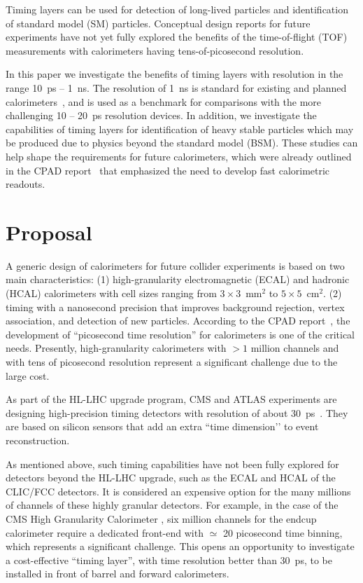 \documentclass[final,1p,11pt]{elsarticle}
\begin{document}
Timing layers can be used for detection of long-lived particles and identification of standard model (SM) particles. 
Conceptual design reports for future experiments have not yet fully explored 
the benefits of the time-of-flight (TOF) measurements with calorimeters having tens-of-picosecond resolution.

In this paper we investigate the benefits of timing layers with resolution in the range 10~ps -- 1~ns. 
The resolution of 1~ns is standard for existing and planned calorimeters~\cite{Linssen:1425915,Behnke:2013xla,Benedikt:2206376,Tang:2015qga}, and is used as a benchmark for comparisons with the more challenging 10 -- 20~ps  resolution devices. 
In addition, we investigate the capabilities of timing layers for identification of heavy stable particles which may be produced due to 
 physics beyond the 
standard model (BSM). These studies can help shape the requirements for future calorimeters, which were already 
outlined in the CPAD report~\cite{Ahmed:2019sim} that emphasized the need to develop fast calorimetric readouts.
  
\section{Proposal}


A generic design of calorimeters for future collider experiments 
is based on two main characteristics: (1) high-granularity  electromagnetic (ECAL) and hadronic (HCAL) 
calorimeters with cell sizes ranging from $3\times 3$~mm$^2$ to $5\times 5$~cm$^2$.
(2) timing with a nanosecond precision that improves background rejection, vertex association, and detection of new particles. 
According to the CPAD report~\cite{Ahmed:2019sim}, the development of ``picosecond time resolution'' for calorimeters is one 
 of the critical needs. 
Presently,  high-granularity calorimeters with $>1$ million channels and with tens of picosecond resolution represent a 
significant challenge due to the large cost.

As part of the HL-LHC upgrade program, CMS and ATLAS experiments are designing high-precision timing detectors with 
 resolution of about 30~ps~\cite{Collaboration:2623663,CMS:2667167}. They are based on silicon sensors that add an 
 extra ``time dimension’’ to event reconstruction. 

As mentioned above, such timing capabilities have not been fully explored for detectors beyond the HL-LHC upgrade, such as 
 the ECAL and HCAL of the CLIC/FCC detectors. 
It is considered an expensive option for the many millions of channels of these highly granular detectors. 
For example, in the case of the CMS High Granularity Calorimeter \cite{Collaboration:2293646},
six  million channels for the endcup calorimeter require a dedicated front-end with $\simeq$ 20 picosecond time binning, which represents 
a significant challenge. 
This opens an opportunity to investigate a cost-effective ``timing layer'', with time resolution better than 30~ps,  
 to be installed in front of barrel and forward calorimeters.
\end{document}

